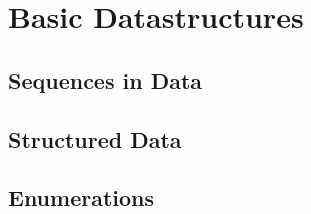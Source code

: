 \chapter{Basic Datastructures}

\section{Sequences in Data}

\section{Structured Data}

\section{Enumerations}

